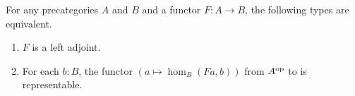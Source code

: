 \documentclass[hott-all.tex]{subfiles}
\begin{document}
\begin{lem}
  For any precategories $A$ and $B$ and a functor $F:A\to B$, the following types are equivalent.
  \begin{enumerate}
  \item $F$ is a left adjoint.
  \item For each $b:B$, the functor $(a \mapsto \hom_B(Fa,b))$ from $A^{\mathrm{op}}$ to \uset is representable.
  \end{enumerate}
\end{lem}
%
%
%
\end{document}
